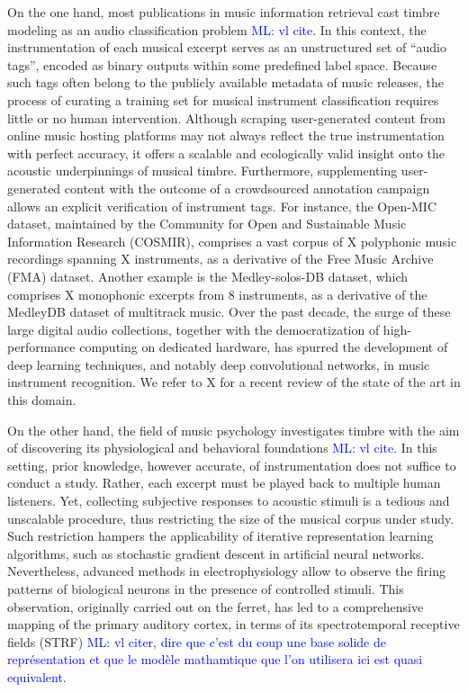 \documentclass{bmcart}
\newcommand{\ml}[1]{\textcolor{blue}{ML: #1}}
\begin{document}
On the one hand, most publications in music information retrieval cast timbre modeling as an audio classification problem  \ml{vl cite}.
In this context, the instrumentation of each musical excerpt serves as an unstructured set of ``audio tags'', encoded as binary outputs within some predefined label space.
Because such tags often belong to the publicly available metadata of music releases, the process of curating a training set for musical instrument classification requires little or no human intervention.
Although scraping user-generated content from online music hosting platforms may not always reflect the true instrumentation with perfect accuracy, it offers a scalable and ecologically valid insight onto the acoustic underpinnings of musical timbre.
Furthermore, supplementing user-generated content with the outcome of a crowdsourced annotation campaign  allows an explicit verification of instrument tags.
For instance, the Open-MIC dataset, maintained by the Community for Open and Sustainable Music Information Research (COSMIR), comprises a vast corpus of X polyphonic music recordings spanning X instruments, as a derivative of the Free Music Archive (FMA) dataset.
Another example is the Medley-solos-DB dataset, which comprises X monophonic excerpts from 8 instruments, as a derivative of the MedleyDB dataset of multitrack music.
Over the past decade, the surge of these large digital audio collections, together with the democratization of high-performance computing on dedicated hardware, has spurred the development of deep learning techniques, and notably deep convolutional networks, in music instrument recognition.
We refer to X for a recent review of the state of the art in this domain.

On the other hand, the field of music psychology investigates timbre with the aim of discovering its physiological and behavioral foundations \ml{vl cite}.
In this setting, prior knowledge, however accurate, of instrumentation does not suffice to conduct a study.
Rather, each excerpt must be played back to multiple human listeners.
Yet, collecting subjective responses to acoustic stimuli is a tedious and unscalable procedure, thus restricting the size of the musical corpus under study.
Such restriction hampers the applicability of iterative representation learning algorithms, such as stochastic gradient descent in artificial neural networks.
Nevertheless, advanced methods in electrophysiology allow to observe the firing patterns of biological neurons in the presence of controlled stimuli.
This observation, originally carried out on the ferret, has led to a comprehensive mapping of the primary auditory cortex, in terms of its spectrotemporal receptive fields (STRF) \ml{vl citer, dire que c'est du coup une base solide de représentation et que le modèle mathamtique que l'on utilisera ici est quasi equivalent}.
\end{document}
